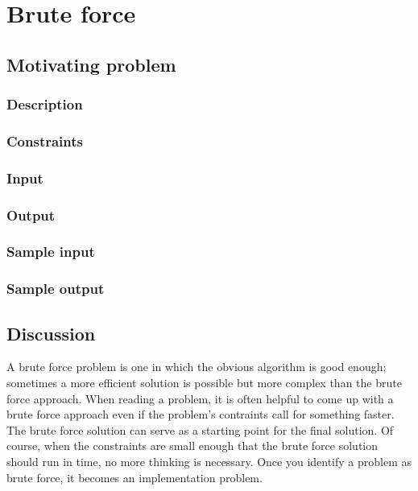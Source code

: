 \section{Brute force}

\subsection*{Motivating problem}

\subsubsection*{Description}

\subsubsection*{Constraints}

\subsubsection*{Input}

\subsubsection*{Output}

\subsubsection*{Sample input}

\subsubsection*{Sample output}

\subsection*{Discussion}

A brute force problem is one in which the obvious algorithm is good enough; sometimes a more efficient solution is possible but more complex than the brute force approach. When reading a problem, it is often helpful to come up with a brute force approach even if the problem's contraints call for something faster. The brute force solution can serve as a starting point for the final solution. Of course, when the constraints are small enough that the brute force solution should run in time, no more thinking is necessary. Once you identify a problem as brute force, it becomes an implementation problem.

